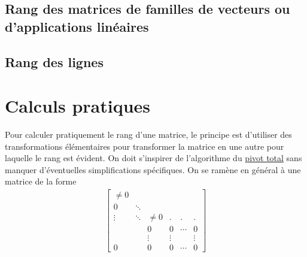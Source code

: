 \subsection{Rang des matrices de familles de vecteurs ou d'applications linéaires}
\subsection{Rang des lignes}
\section{Calculs pratiques}
Pour calculer pratiquement le rang d'une matrice, le principe est d'utiliser des transformations élémentaires pour transformer la matrice en une autre pour laquelle le rang est évident. On doit s'inspirer de l'algorithme du \href{\baseurl C2234.pdf}{pivot total} sans manquer d'éventuelles simplifications spécifiques. On se ramène en général à une matrice de la forme
\begin{align*}
\begin{bmatrix}
 \neq 0 &  &  &  &  &  \\
 0 & \ddots &  &  &  &  \\
 \vdots &\ddots  &\neq 0 & .& .& . \\
        &        &0      &0 & \cdots &  0\\
        &        &\vdots & \vdots &  &\vdots  \\
 0      &        &   0   &   0    & \cdots & 0
\end{bmatrix}
\end{align*}

